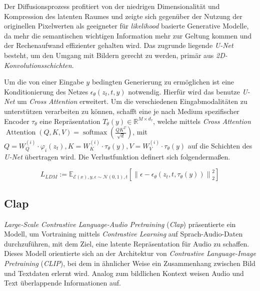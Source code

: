 \documentclass[
  a4paper,  %
  twoside,  %
  bibliography=totoc,
  headsepline,
  cleardoublepage=empty,
  parskip=half,
  draft=false
]{scrbook}
\begin{document}
Der Diffusionsprozess profitiert von der niedrigen Dimensionalität und Kompression des latenten Raumes und zeigte sich gegenüber der Nutzung der originellen Pixelwerten als geeigneter für \emph{likelihood} basierte Generative Modelle, da mehr die semantischen wichtigen Information mehr zur Geltung kommen und der Rechenaufwand effizienter gehalten wird. Das zugrunde liegende \emph{U-Net} \cite{ronneberger_u-net_2015} besteht, um den Umgang mit Bildern gerecht zu werden, primär aus \emph{2D-Konvolutionsschichten}. \cite{rombach_high-resolution_2022}

Um die von einer Eingabe $y$ bedingten Generierung zu ermöglichen ist eine Konditionierung des Netzes $\epsilon_\theta\left(z_t, t, y\right)$ notwendig. Hierfür wird das benutze \emph{U-Net} um \emph{Cross Attention}\cite{vaswani_attention_2017} erweitert. Um die verschiedenen Eingabmodalitäten zu unterstützen verarbeiten zu können, schafft eine je nach Medium spezifischer Encoder $\tau_\theta$ eine Repräsentation $T_\theta(y) \in \mathbb{R}^{M \times d_\tau}$, welche mittels \emph{Cross Attention} $\operatorname{Attention}(Q, K, V)=\operatorname{softmax}\left(\frac{Q K^T}{\sqrt{d}}\right)$, mit $Q=W_Q^{(i)} \cdot \varphi_i\left(z_t\right), K=W_K^{(i)} \cdot \tau_\theta(y), V=W_V^{(i)} \cdot \tau_\theta(y)$ auf die Schichten des \emph{U-Net} übertragen wird. Die Verlustfunktion definert sich folgendermaßen. \cite{rombach_high-resolution_2022}

\begin{equation}
L_{L D M}:=\mathbb{E}_{\mathcal{E}(x), y, \epsilon \sim \mathcal{N}(0,1), t}\left[\left\|\epsilon-\epsilon_\theta\left(z_t, t, \tau_\theta(y)\right)\right\|_2^2\right]
\end{equation}


\subsection{Clap}

\emph{Large-Scale Contrastive Language-Audio Pretraining} (\emph{Clap})\cite{wu_large-scale_2023} präsentierte ein Modell, um Vortraining mittels \emph{Contrastive Learning} auf Sprach-Audio-Daten durchzuführen, mit dem Ziel, eine latente Repräsentation für Audio zu schaffen. Dieses Modell orientierte sich an der Architektur von \emph{Contrastive Language-Image Pretraining} (\emph{CLIP})\cite{radford_learning_2021}, bei dem in ähnlicher Weise ein Zusammenhang zwischen Bild und Textdaten erlernt wird. Analog zum bildlichen Kontext weisen Audio und Text überlappende Informationen auf. \cite{wu_large-scale_2023}
\end{document}
